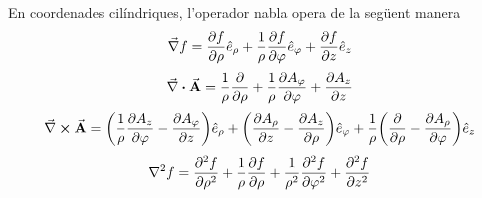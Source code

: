 \begin{defi}
	En coordenades cilíndriques, l'operador nabla opera de la següent manera
	\begin{align}
		\vec{\nabla} f = \pdv{f}{\rho} \hat{e}_{\rho} + \frac{1}{\rho}\pdv{f}{\varphi} \hat{e}_{\varphi} + \pdv{f}{z} \hat{e}_{z}
	\end{align}
	\begin{align}
		\div{A} = \frac{1}{\rho} \pdv{}{\rho} (\rho A_{\rho}) + \frac{1}{\rho} \pdv{A_{\varphi}}{\varphi} + \pdv{A_{z}}{z}
	\end{align}
	\begin{align}
		\rot{A} = \qty( \frac{1}{\rho} \pdv{A_{z}}{\varphi} - \pdv{A_{\varphi}}{z} ) \hat{e}_{\rho} + \qty( \pdv{A_{\rho}}{z} - \pdv{A_{z}}{\rho} ) \hat{e}_{\varphi} + \frac{1}{\rho} \qty( \pdv{}{\rho} (\rho A_{\varphi}) - \pdv{A_{\rho}}{\varphi} ) \hat{e}_{z}
	\end{align}
	\begin{align}
		\nabla^{2} f = \pdv[2]{f}{\rho} + \frac{1}{\rho} \pdv{f}{\rho} + \frac{1}{\rho^{2}} \pdv[2]{f}{\varphi} + \pdv[2]{f}{z}
	\end{align}
\end{defi}

